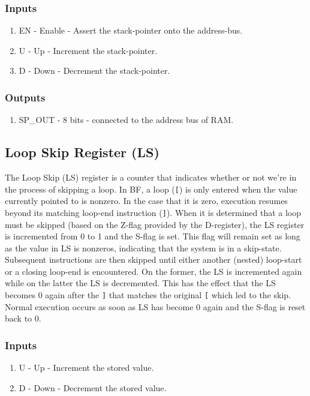 \subsubsection*{Inputs}
\begin{enumerate}
\itemsep0em 
\item EN - Enable - Assert the stack-pointer onto the address-bus.
\item U - Up - Increment the stack-pointer.
\item D - Down - Decrement the stack-pointer.
\end{enumerate}

\subsubsection*{Outputs}
\begin{enumerate}
\itemsep0em 
\item SP\_OUT - 8 bits - connected to the address bus of RAM.
\end{enumerate}

\subsection{Loop Skip Register (LS)} \label{sec:architecture:ls}
The Loop Skip (LS) register is a counter that indicates whether or not we're in the process of skipping a loop. In BF, a loop (\texttt{[}) is only entered when the value currently pointed to is nonzero. In the case that it is zero, execution resumes beyond its matching loop-end instruction (\texttt{]}). When it is determined that a loop must be skipped (based on the Z-flag provided by the D-register), the LS register is incremented from 0 to 1 and the S-flag is set. This flag will remain set as long as the value in LS is nonzeros, indicating that the system is in a skip-state. Subsequent instructions are then skipped until either another (nested) loop-start or a closing loop-end is encountered. On the former, the LS is incremented again while on the latter the LS is decremented. This has the effect that the LS becomes 0 again after the \texttt{]} that matches the original \texttt{[} which led to the skip. Normal execution occurs as soon as LS has become 0 again and the S-flag is reset back to 0.

\subsubsection*{Inputs}
\begin{enumerate}
  \itemsep0em
\item U - Up - Increment the stored value.
\item D - Down - Decrement the stored value.
\end{enumerate}


